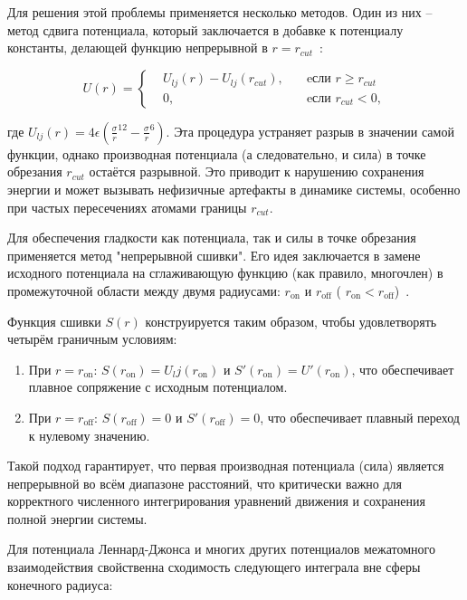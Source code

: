 Для решения этой проблемы применяется несколько методов. Один из них \--- метод сдвига потенциала, который заключается в добавке к потенциалу константы, делающей функцию непрерывной в $r = r_{cut}$~\cite{toxvaerd_communication_2011}:

\[
U(r) = \left\{
\begin{alignedat}{2}
    &U_{lj}(r) - U_{lj}(r_{cut}), \quad &\text{eсли } r\geqslant r_{cut} \\
    &0, \quad & \text{eсли } r_{cut}<0, 
\end{alignedat}
\right.
\]

где $U_{lj}(r) = 4 \epsilon (\frac{\sigma}{r}^{12}-\frac{\sigma}{r}^6)$. Эта процедура устраняет разрыв в значении самой функции, однако производная потенциала (а следовательно, и сила) в точке обрезания  $r_{cut}$  остаётся разрывной. Это приводит к нарушению сохранения энергии и может вызывать нефизичные артефакты в динамике системы, особенно при частых пересечениях атомами границы $r_{cut}$.

Для обеспечения гладкости как потенциала, так и силы в точке обрезания применяется метод "непрерывной сшивки". Его идея заключается в замене исходного потенциала на сглаживающую функцию (как правило, многочлен) в промежуточной области между двумя радиусами:  $r_{\text{on}}$  и  $r_{\text{off}}$  ( $r_{\text{on}} < r_{\text{off}}$)~\cite{marrink_coarse_2004}.

Функция сшивки $S(r)$ конструируется таким образом, чтобы удовлетворять четырём граничным условиям:

\begin{enumerate}

\item При  $r = r_{\text{on}}$:  $S(r_{\text{on}}) = U_lj(r_{\text{on}})$  и  $S'(r_{\text{on}}) = U'(r_{\text{on}})$, что обеспечивает плавное сопряжение с исходным потенциалом.
\item При  $r = r_{\text{off}}$:  $S(r_{\text{off}}) = 0$  и  $S'(r_{\text{off}}) = 0$, что обеспечивает плавный переход к нулевому значению.

\end{enumerate}

Такой подход гарантирует, что первая производная потенциала (сила) является непрерывной во всём диапазоне расстояний, что критически важно для корректного численного интегрирования уравнений движения и сохранения полной энергии системы. 

Для потенциала Леннард-Джонса и многих других потенциалов межатомного взаимодействия свойственна сходимость следующего интеграла вне сферы конечного радиуса:

